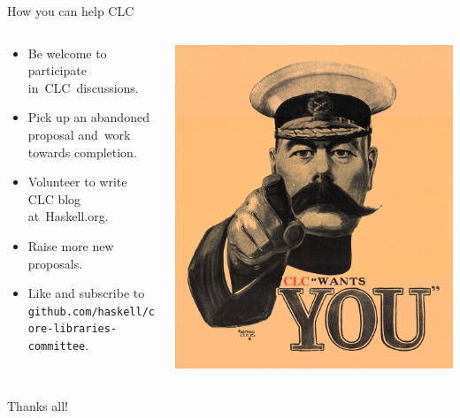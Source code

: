 \documentclass[handout]{beamer}
\begin{document}
\begin{frame}{How you can help CLC}

\begin{columns}[T]
  \begin{column}{.53\textwidth}

\begin{itemize}[<+->]

\item Be welcome to participate in~CLC~discussions.
\bigskip

\item Pick up an abandoned proposal and~work towards completion.
\bigskip

\item Volunteer to write CLC blog at~Haskell.org.
\bigskip

\item Raise more new proposals.
\bigskip

\item Like and subscribe to {\tt github.com/haskell/core-libraries-committee}.


\end{itemize}

\end{column}

\begin{column}{.47\textwidth}
  \includegraphics[width=\textwidth]{wants-you.jpg}
\end{column}

\end{columns}

\bigskip\pause

\centerline{\Huge Thanks all!}

\end{frame}
\end{document}
